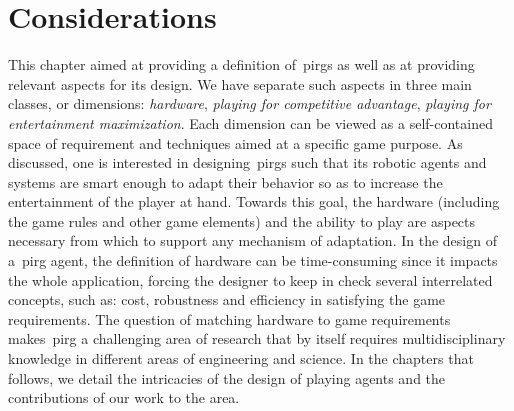 \section{Considerations}
This chapter aimed at providing a definition of~\gls{pirg}s as well as at providing relevant aspects for its design. We have separate such aspects in three main classes, or dimensions: \textit{hardware}, \textit{playing for competitive advantage}, \textit{playing for entertainment maximization}. Each dimension can be viewed as a self-contained space of requirement and techniques aimed at a specific game purpose. As discussed, one is interested in designing~\gls{pirg}s such that its robotic agents and systems are smart enough to adapt their behavior so as to increase the entertainment of the player at hand. Towards this goal, the hardware (including the game rules and other game elements) and the ability to play are aspects necessary from which to support any mechanism of adaptation. In the design of a~\gls{pirg} agent, the definition of hardware can be time-consuming since it impacts the whole application, forcing the designer to keep in check several interrelated concepts, such as: cost, robustness and efficiency in satisfying the game requirements. The question of matching hardware to game requirements makes~\gls{pirg} a challenging area of research that by itself requires multidisciplinary knowledge in different areas of engineering and science. In the chapters that follows, we detail the intricacies of the design of playing agents and the contributions of our work to the area.